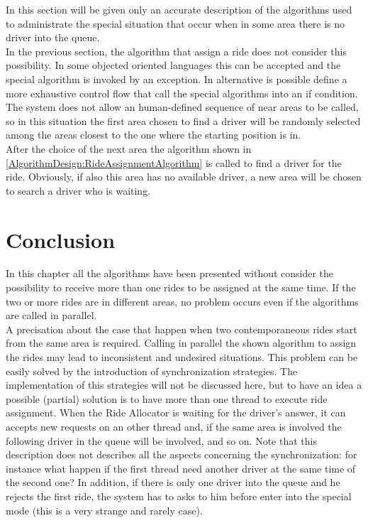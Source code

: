 \documentclass[\mainpath/main]{subfiles}
\begin{document}
In this section will be given only an accurate description of the algorithms used to administrate the special situation that occur when in some area there is no driver into the queue.\\
In the previous section, the algorithm that assign a ride does not consider this possibility. In some objected oriented languages this can be accepted and the special algorithm is invoked by an exception. In alternative is possible define a more exhaustive control flow that call the special algorithms into an if condition.\\
The system does not allow an human-defined sequence of near areas to be called, so in this situation the first area chosen to find a driver will be randomly selected among the areas closest to the one where the starting position is in.\\
After the choice of the next area the algorithm shown in \autoref{AlgorithmDesign:RideAssignmentAlgorithm} is called to find a driver for the ride. Obviously, if also this area has no available driver, a new area will be chosen to search a driver who is waiting.\\

\section{Conclusion}
\label{AlgorithmDesign:conclusion}

In this chapter all the algorithms have been presented without consider the possibility to receive more than one rides to be assigned at the same time. If the two or more rides are in different areas, no problem occurs even if the algorithms are called in parallel.\\
A precisation about the case that happen when two contemporaneous rides start from the same area is required. Calling in parallel the shown algorithm to assign the rides may lead to inconsistent and undesired situations. This problem can be easily solved by the introduction of synchronization strategies. The implementation of this strategies will not be discussed here, but to have an idea a possible (partial) solution is to have more than one thread to execute ride assignment. When the Ride Allocator is waiting for the driver's answer, it can accepts new requests on an other thread and, if the same area is involved the following driver in the queue will be involved, and so on. Note that this description does not describes all the aspects concerning the synchronization: for instance what happen if the first thread need another driver at the same time of the second one? In addition, if there is only one driver into the queue and he rejects the first ride, the system has to asks to him before enter into the special mode (this is a very strange and rarely case).
\end{document}
